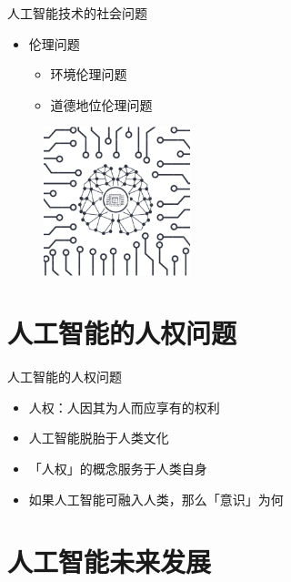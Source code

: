 \documentclass{beamer}
\begin{document}
\begin{frame}{人工智能技术的社会问题}
  \begin{itemize}
    \item 伦理问题 
      \begin{itemize}
       \item  环境伦理问题 
       \item  道德地位伦理问题  
      \end{itemize}
  \end{itemize}

  \begin{figure}[H]
   \centering
   \includegraphics[height=1.7in]{zsjPic5.jpg}
   \end{figure}

\end{frame} 

  \section{人工智能的人权问题}
  \begin{frame}{人工智能的人权问题}
    \begin{itemize}
     \item 人权：人因其为人而应享有的权利
     \item 人工智能脱胎于人类文化
     \item 「人权」的概念服务于人类自身  
     \item 如果人工智能可融入人类，那么「意识」为何
    \end{itemize}
  \end{frame}

  \section{人工智能未来发展}
\end{document}
